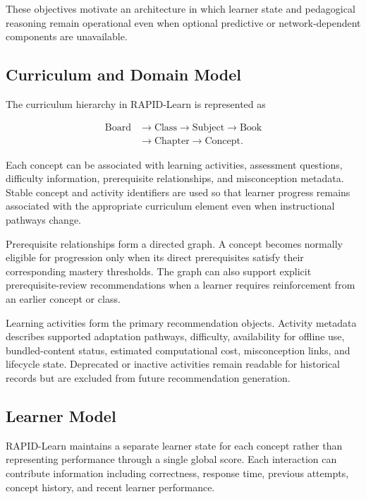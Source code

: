 \documentclass[conference]{IEEEtran}
\begin{document}
These objectives motivate an architecture in which learner state and pedagogical reasoning remain operational even when optional predictive or network-dependent components are unavailable.

\subsection{Curriculum and Domain Model}

The curriculum hierarchy in RAPID-Learn is represented as

\begin{equation*}
\begin{aligned}
\text{Board} &\to \text{Class} \to \text{Subject} \to \text{Book}\\
             &\to \text{Chapter} \to \text{Concept}.
\end{aligned}
\end{equation*}

Each concept can be associated with learning activities, assessment questions, difficulty information, prerequisite relationships, and misconception metadata. Stable concept and activity identifiers are used so that learner progress remains associated with the appropriate curriculum element even when instructional pathways change.

Prerequisite relationships form a directed graph. A concept becomes normally eligible for progression only when its direct prerequisites satisfy their corresponding mastery thresholds. The graph can also support explicit prerequisite-review recommendations when a learner requires reinforcement from an earlier concept or class.

Learning activities form the primary recommendation objects. Activity metadata describes supported adaptation pathways, difficulty, availability for offline use, bundled-content status, estimated computational cost, misconception links, and lifecycle state. Deprecated or inactive activities remain readable for historical records but are excluded from future recommendation generation.

\subsection{Learner Model}

RAPID-Learn maintains a separate learner state for each concept rather than representing performance through a single global score. Each interaction can contribute information including correctness, response time, previous attempts, concept history, and recent learner performance.
\end{document}
